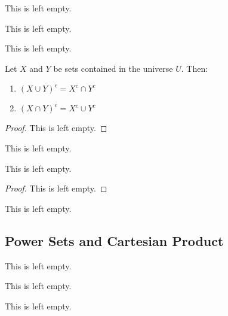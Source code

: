 \begin{definition}
    This is left empty.
\end{definition}

\begin{proposition}
    This is left empty.
\end{proposition}

\begin{remark}
    This is left empty.
\end{remark}

\begin{theorem} Let $X$ and $Y$ be sets contained in the universe $U$. Then:

    \begin{enumerate}
        \item $(X \cup Y)^c = X^c \cap Y^c$
        \item $(X \cap Y)^c = X^c \cup Y^c$
    \end{enumerate}
    \begin{proof}
        This is left empty.
    \end{proof}
\end{theorem}

\begin{definition}[Difference]
    This is left empty.
\end{definition}

\begin{proposition}
    This is left empty.
    \begin{proof}
        This is left empty.
    \end{proof}
\end{proposition}

\begin{definition}
    This is left empty.
\end{definition}

\subsection{Power Sets and Cartesian Product}

\begin{definition}
    This is left empty.
\end{definition}

\begin{example}
    This is left empty.
\end{example}

\begin{definition}
    This is left empty.
\end{definition}

